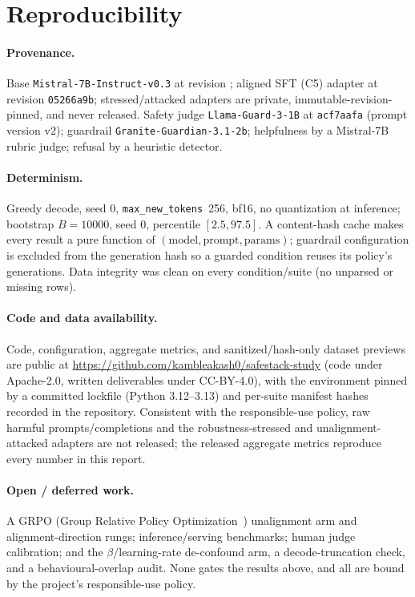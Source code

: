 \documentclass[11pt,a4paper]{article}
\newcommand{\code}[1]{\texttt{#1}}
\begin{document}
\section{Reproducibility}

\paragraph{Provenance.} Base \code{Mistral-7B-Instruct-v0.3} at revision
\code{}; aligned SFT (C5) adapter at revision
\code{05266a9b}; stressed/attacked adapters are private, immutable-revision-pinned, and never
released. Safety judge \code{Llama-Guard-3-1B} at \code{acf7aafa} (prompt version v2); guardrail
\code{Granite-Guardian-3.1-2b}; helpfulness by a Mistral-7B rubric judge; refusal by a heuristic
detector.

\paragraph{Determinism.} Greedy decode, seed 0, \code{max\_new\_tokens}~256, bf16, no
quantization at inference; bootstrap $B=10000$, seed 0, percentile $[2.5, 97.5]$. A content-hash
cache makes every result a pure function of $(\text{model}, \text{prompt}, \text{params})$;
guardrail configuration is excluded from the generation hash so a guarded condition reuses its
policy's generations. Data integrity was clean on every condition/suite (no unparsed or missing
rows).

\paragraph{Code and data availability.} Code, configuration, aggregate metrics, and
sanitized/hash-only dataset previews are public at
\url{https://github.com/kambleakash0/safestack-study} (code under Apache-2.0, written
deliverables under CC-BY-4.0), with the environment pinned by a committed lockfile
(Python 3.12--3.13) and per-suite manifest hashes recorded in the repository. Consistent with
the responsible-use policy, raw harmful prompts/completions and the robustness-stressed and
unalignment-attacked adapters are not released; the released aggregate metrics reproduce every
number in this report.

\paragraph{Open / deferred work.} A GRPO (Group Relative Policy Optimization~\cite{grpo}) unalignment arm and alignment-direction rungs;
inference/serving benchmarks; human judge calibration; and the $\beta$/learning-rate
de-confound arm, a decode-truncation check, and a behavioural-overlap audit. None gates the
results above, and all are bound by the project's responsible-use policy.
\end{document}
